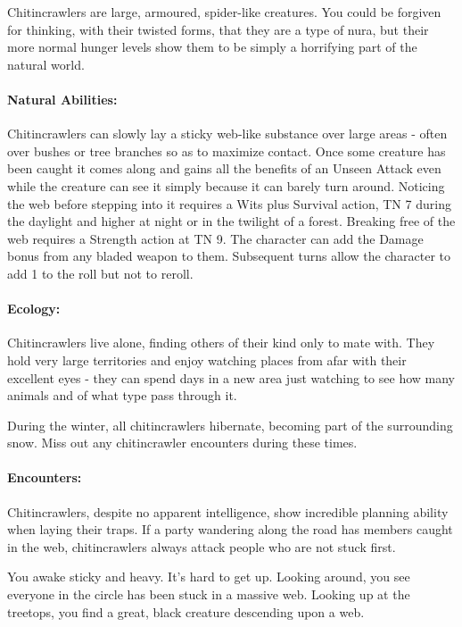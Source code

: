 \label{chitincrawler}
\chitincrawler

Chitincrawlers are large, armoured, spider-like creatures.  You could be forgiven for thinking, with their twisted forms, that they are a type of nura, but their more normal hunger levels show them to be simply a horrifying part of the natural world.

	\paragraph{Natural Abilities:} Chitincrawlers can slowly lay a sticky web-like substance over large areas - often over bushes or tree branches so as to maximize contact.  Once some creature has been caught it comes along and gains all the benefits of an Unseen Attack even while the creature can see it simply because it can barely turn around.  Noticing the web before stepping into it requires a Wits plus Survival action, TN 7 during the daylight and higher at night or in the twilight of a forest.  Breaking free of the web requires a Strength action at TN 9.  The character can add the Damage bonus from any bladed weapon to them.  Subsequent turns allow the character to add 1 to the roll but not to reroll.

	\paragraph{Ecology:} Chitincrawlers live alone, finding others of their kind only to mate with.  They hold very large territories and enjoy watching places from afar with their excellent eyes - they can spend days in a new area just watching to see how many animals and of what type pass through it.

During the winter, all chitincrawlers hibernate, becoming part of the surrounding snow.  Miss out any chitincrawler encounters during these times.

	\paragraph{Encounters:} Chitincrawlers, despite no apparent intelligence, show incredible planning ability when laying their traps.  If a party wandering along the road has members caught in the web, chitincrawlers always attack people who are not stuck first.

\begin{boxtext}
You awake sticky and heavy.  It's hard to get up.  Looking around, you see everyone in the circle has been stuck in a massive web.  Looking up at the treetops, you find a great, black creature descending upon a web.
\end{boxtext}


